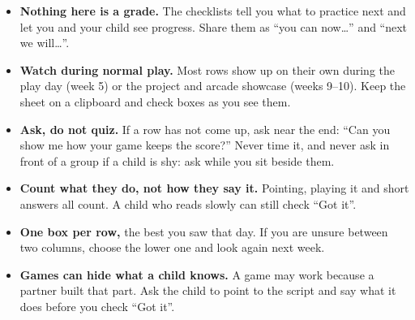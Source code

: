
\begin{teachernote}
\begin{itemize}[itemsep=1pt]
  \item \textbf{Nothing here is a grade.} The checklists tell you what to practice next and let you
        and your child see progress. Share them as \enquote{you can now\dots} and \enquote{next we will\dots}.
  \item \textbf{Watch during normal play.} Most rows show up on their own during the play day (week 5)
        or the project and arcade showcase (weeks 9--10). Keep the sheet on a clipboard and check boxes
        as you see them.
  \item \textbf{Ask, do not quiz.} If a row has not come up, ask near the end:
        \enquote{Can you show me how your game keeps the score?} Never time it, and never ask in front
        of a group if a child is shy: ask while you sit beside them.
  \item \textbf{Count what they do, not how they say it.} Pointing, playing it and short answers all
        count. A child who reads slowly can still check \enquote{Got it}.
  \item \textbf{One box per row,} the best you saw that day. If you are unsure between two columns,
        choose the lower one and look again next week.
  \item \textbf{Games can hide what a child knows.} A game may work because a partner built that
        part. Ask the child to point to the script and say what it does before you check \enquote{Got it}.
\end{itemize}
\end{teachernote}

\newcommand{\smguide}[5]{%
  \par\needspace{7\baselineskip}\noindent\textbf{\color{kcaccent}#1}\par
  \begin{itemize}[leftmargin=1.4em,itemsep=1pt,topsep=2pt]
    \item[\faSeedling] \textbf{Not yet:} #2
    \item[\faShoePrints] \textbf{Getting there:} #3
    \item[\faCheckCircle] \textbf{Got it:} #4
    \item[\faArrowRight] \textbf{If not yet:} #5
  \end{itemize}\medskip}

